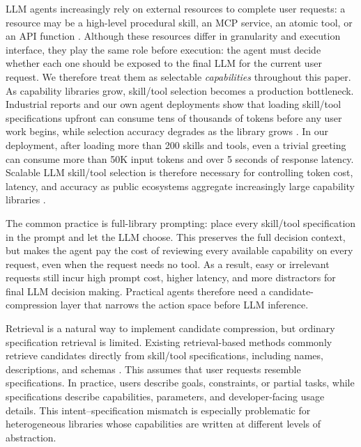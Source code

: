 \documentclass[11pt]{article}
\begin{document}
LLM agents increasingly rely on external resources to complete user requests: a resource may be a high-level procedural skill, an MCP service, an atomic tool, or an API function \citep{schick2023toolformer, qin2023toolllm, patil2024gorilla}. Although these resources differ in granularity and execution interface, they play the same role before execution: the agent must decide whether each one should be exposed to the final LLM for the current user request. We therefore treat them as selectable \emph{capabilities} throughout this paper. As capability libraries grow, skill/tool selection becomes a production bottleneck. Industrial reports and our own agent deployments show that loading skill/tool specifications upfront can consume tens of thousands of tokens before any user work begins, while selection accuracy degrades as the library grows \citep{anthropic_tool_search, anthropic_advanced_tool_use}. In our deployment, after loading more than 200 skills and tools, even a trivial greeting can consume more than 50K input tokens and over 5 seconds of response latency. Scalable LLM skill/tool selection is therefore necessary for controlling token cost, latency, and accuracy as public ecosystems aggregate increasingly large capability libraries \citep{clawhub, lin2025masstool, mo2025livemcpbench, xu2025tps}.

The common practice is full-library prompting: place every skill/tool specification in the prompt and let the LLM choose. This preserves the full decision context, but makes the agent pay the cost of reviewing every available capability on every request, even when the request needs no tool. As a result, easy or irrelevant requests still incur high prompt cost, higher latency, and more distractors for final LLM decision making. Practical agents therefore need a candidate-compression layer that narrows the action space before LLM inference.


Retrieval is a natural way to implement candidate compression, but ordinary specification retrieval is limited. Existing retrieval-based methods commonly retrieve candidates directly from skill/tool specifications, including names, descriptions, and schemas \citep{agarwal2025toolrm, lin2025masstool, zheng2026skillrouter}. This assumes that user requests resemble specifications. In practice, users describe goals, constraints, or partial tasks, while specifications describe capabilities, parameters, and developer-facing usage details. This intent--specification mismatch is especially problematic for heterogeneous libraries whose capabilities are written at different levels of abstraction.
\end{document}
